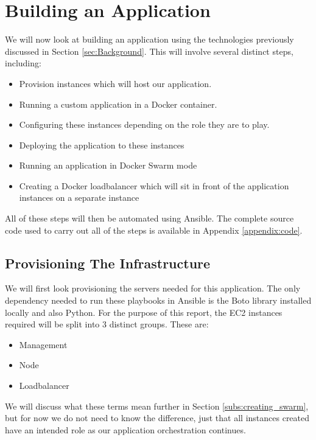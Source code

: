 \documentclass{article}
\begin{document}
\newpage
\section{Building an Application}
\label{sec:Build}
We will now look at building an application using the technologies previously discussed in Section \ref{sec:Background}. This will involve several distinct steps, including:

\begin{itemize}
  \item Provision instances which will host our application.
  \item Running a custom application in a Docker container.
  \item Configuring these instances depending on the role they are to play.
  \item Deploying the application to these instances
  \item Running an application in Docker Swarm mode
  \item Creating a Docker loadbalancer which will sit in front of the application instances on a separate instance
\end{itemize}

All of these steps will then be automated using Ansible. The complete source code used to carry out all of the steps is available in Appendix \ref{appendix:code}.

\subsection{Provisioning The Infrastructure}
\label{subs:provision}
We will first look provisioning the servers needed for this application. The only dependency needed to run these playbooks in Ansible is the Boto library \citep{Boto2016} installed locally and also Python. For the purpose of this report, the EC2 instances required will be split into 3 distinct groups. These are:

\begin{itemize}
  \item Management
  \item Node
  \item Loadbalancer
\end{itemize}

We will discuss what these terms mean further in Section \ref{subs:creating_swarm}, but for now we do not need to know the difference, just that all instances created have an intended role as our application orchestration continues.
\end{document}
